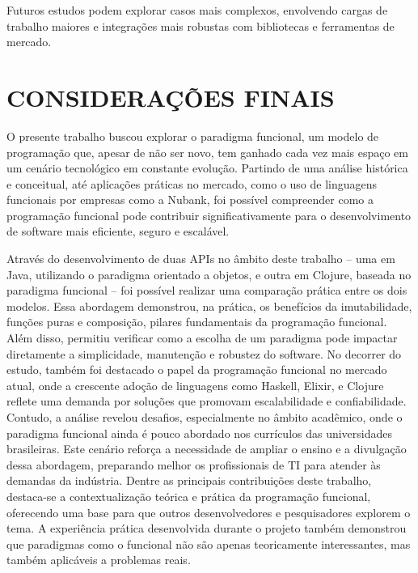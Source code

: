 Futuros estudos podem explorar casos mais complexos, envolvendo cargas de trabalho maiores e integrações mais robustas com bibliotecas e ferramentas de mercado.




\chapter{CONSIDERAÇÕES FINAIS}

O presente trabalho buscou explorar o paradigma funcional, um modelo de programação que, apesar de não ser novo, tem ganhado cada vez mais espaço em um cenário tecnológico em constante evolução. Partindo de uma análise histórica e conceitual, até aplicações práticas no mercado, como o uso de linguagens funcionais por empresas como a Nubank, foi possível compreender como a programação funcional pode contribuir significativamente para o desenvolvimento de software mais eficiente, seguro e escalável.

Através do desenvolvimento de duas APIs no âmbito deste trabalho – uma em Java, utilizando o paradigma orientado a objetos, e outra em Clojure, baseada no paradigma funcional – foi possível realizar uma comparação prática entre os dois modelos. Essa abordagem demonstrou, na prática, os benefícios da imutabilidade, funções puras e composição, pilares fundamentais da programação funcional. Além disso, permitiu verificar como a escolha de um paradigma pode impactar diretamente a simplicidade, manutenção e robustez do software.
No decorrer do estudo, também foi destacado o papel da programação funcional no mercado atual, onde a crescente adoção de linguagens como Haskell, Elixir, e Clojure reflete uma demanda por soluções que promovam escalabilidade e confiabilidade. Contudo, a análise revelou desafios, especialmente no âmbito acadêmico, onde o paradigma funcional ainda é pouco abordado nos currículos das universidades brasileiras. Este cenário reforça a necessidade de ampliar o ensino e a divulgação dessa abordagem, preparando melhor os profissionais de TI para atender às demandas da indústria.
Dentre as principais contribuições deste trabalho, destaca-se a contextualização teórica e prática da programação funcional, oferecendo uma base para que outros desenvolvedores e pesquisadores explorem o tema. A experiência prática desenvolvida durante o projeto também demonstrou que paradigmas como o funcional não são apenas teoricamente interessantes, mas também aplicáveis a problemas reais.


